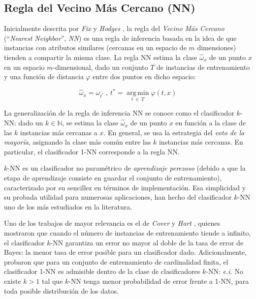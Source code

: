 \subsection{Regla del Vecino Más Cercano (NN)}

Inicialmente descrita por \emph{Fix} y \emph{Hodges} \cite{fix_51_discriminatory}, la regla del \emph{Vecino Más Cercano} (``\emph{Nearest Neighbor}'', \emph{NN}) es una regla de inferencia basada en la idea de que instancias con atributos similares (cercanas en un espacio de $m$ dimensiones) tienden a compartir la misma clase. La regla NN estima la clase $\hat{\omega}_x$ de un punto $x$ en un espacio $m$-dimensional, dado un conjunto $T$ de instancias de entrenamiento y una función de distancia $\varphi$ entre dos puntos en dicho espacio:

\begin{equation}
\hat{\omega}_x = \omega_{t^*}\ ,\ 
t^* = \operatorname*{arg\,min}_{t\ \in\ T} \varphi(t,x)
\end{equation}

La generalización de la regla de inferencia NN se conoce como el clasificador $k$-NN: dado un $k \in \mathbb{N}$, se estima la clase $\hat{\omega}_x$ de un punto $x$ en función a la clase de las $k$ instancias más cercanas a $x$. En general, se usa la estrategia del \guillemotleft\emph{voto de la mayoría}\guillemotright, asignando la clase más común entre las $k$ instancias más cercanas. En particular, el clasificador 1-NN corresponde a la regla NN.

$k$-NN es un clasificador no paramétrico de \emph{aprendizaje perezoso} (debido a que la etapa de aprendizaje consiste en guardar el conjunto de entrenamiento), caracterizado por su sencillez en términos de implementación. Esa simplicidad y su probada utilidad para numerosas aplicaciones, han hecho del clasificador $k$-NN uno de los más estudiados en la literatura.

Uno de los trabajos de mayor relevancia es el de \emph{Cover} y \emph{Hart} \cite{Cover:2006:NNP:2263261.2267456}, quienes mostraron que cuando el número de instancias de entrenamiento tiende a infinito, el clasificador $k$-NN garantiza un error no mayor al doble de la tasa de error de Bayes: la menor tasa de error posible para un clasificador dado. Adicionalmente, probaron que para un conjunto de entrenamiento de cardinalidad finita, el clasificador 1-NN es admisible dentro de la clase de clasificadores $k$-NN: \emph{e.i.} No existe $k > 1$ tal que $k$-NN tenga menor probabilidad de error frente a 1-NN, para toda posible distribución de los datos.

